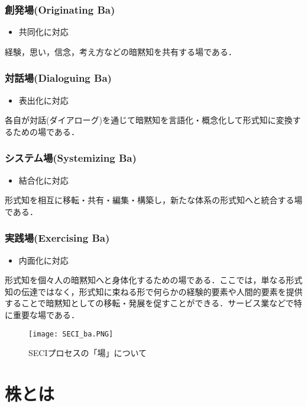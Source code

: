 \subsection{創発場(Originating Ba)}
\begin{itemize}
  \item 共同化に対応
\end{itemize}

経験，思い，信念，考え方などの暗黙知を共有する場である\cite{ba}．

\subsection{対話場(Dialoguing Ba)}
\begin{itemize}
  \item 表出化に対応
\end{itemize}

各自が対話(ダイアローグ)を通じて暗黙知を言語化・概念化して形式知に変換するための場である\cite{ba}．

\subsection{システム場(Systemizing Ba)}
\begin{itemize}
  \item 結合化に対応
\end{itemize}

形式知を相互に移転・共有・編集・構築し，新たな体系の形式知へと統合する場である\cite{ba}．

\subsection{実践場(Exercising Ba)}
\begin{itemize}
  \item 内面化に対応
\end{itemize}

形式知を個々人の暗黙知へと身体化するための場である．ここでは，単なる形式知の伝達ではなく，形式知に束ねる形で何らかの経験的要素や人間的要素を提供することで暗黙知としての移転・発展を促すことができる．サービス業などで特に重要な場である\cite{ba}．

\begin{figure}[H]
\centering
\texttt{[image: SECI\_ba.PNG]}
\caption{SECIプロセスの「場」について}\label{サンプル図}
\end{figure}

\chapter{株とは}
